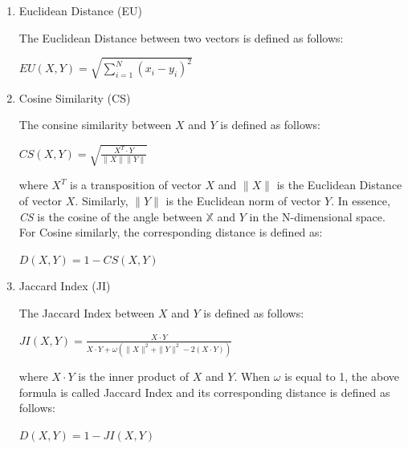 \begin{enumerate}
\item Euclidean Distance (EU)

The Euclidean Distance between two vectors is defined as follows:
\begin{center}
$EU(\mathit{X}, \mathit{Y}) = \displaystyle \sqrt{\sum_{i=1}^{N} (x_i-y_i)^2}$
\end{center}


\item Cosine Similarity (CS)

The consine similarity between $\mathit{X}$ and $\mathit{Y}$ is defined as follows:

\begin{center}
$CS(\mathit{X}, \mathit{Y}) = \displaystyle \sqrt{\frac{\mathit{X}^T \cdot \mathit{Y}} {\| \mathit{X} \|\| \mathit{Y} \|}}$
\end{center}
where $\mathit{X}^T$ is a transposition of vector $\mathit{X}$ and $\| \mathit{X}\|$ is the Euclidean Distance of
vector $\mathit{X}$. Similarly, $\|\mathit{Y}\|$ is the Euclidean norm of vector $\mathit{Y}$. In essence, \textit{CS} is the cosine of the angle between $\mathbb{X}$ and $\mathit{Y}$ in the N-dimensional space. For Cosine similarly, the corresponding distance is defined as:

\begin{center}
$D(\mathit{X},\mathit{Y}) = 1 - CS(\mathit{X},\mathit{Y})$
\end{center}

\item Jaccard Index (JI)

The Jaccard Index between $\mathit{X}$ and $\mathit{Y}$ is defined as follows:

\begin{center}
$JI(\mathit{X}, \mathit{Y}) = \displaystyle \frac{\mathit{X} \cdot \mathit{Y}}{\mathit{X} \cdot \mathit{Y}+\omega(\|\mathit{X}\|^2+\|\mathit{Y}\|^2-2(\mathit{X} \cdot \mathit{Y}))}$
\end{center}

where $\mathit{X} \cdot \mathit{Y}$ is the inner product of $\mathit{X}$ and $\mathit{Y}$. 
When $\omega$ is equal to 1, the above formula is called Jaccard Index and its corresponding distance is defined as follows:

\begin{center}
$D(\mathit{X},\mathit{Y}) = 1 - JI(\mathit{X},\mathit{Y})$
\end{center}

\end{enumerate}

